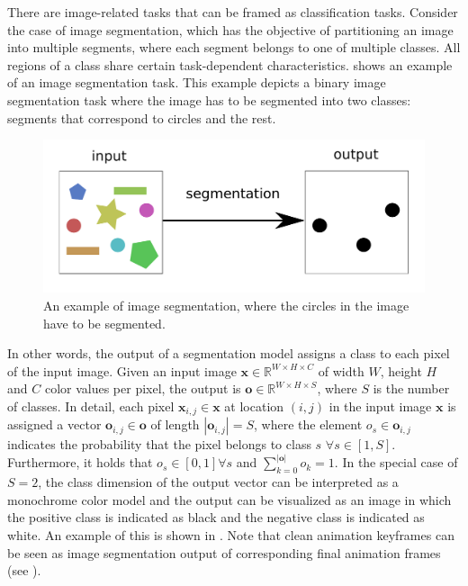 There are image-related tasks that can be framed as classification tasks. Consider the case of image segmentation, which has the objective of partitioning an image into multiple segments, where each segment belongs to one of multiple classes. All regions of a class share certain task-dependent characteristics.  shows an example of an image segmentation task. This example depicts a binary image segmentation task where the image has to be segmented into two classes: segments that correspond to circles and the rest.

\begin{figure}
    \centering
    \includegraphics[width=\textwidth]{graphics/segmentation.pdf}
    \caption{An example of image segmentation, where the circles in the image have to be segmented.}
    \label{fig:segmentation}
\end{figure}

In other words, the output of a segmentation model assigns a class to each pixel of the input image. Given an input image $\mathbf{x}\in\mathbb{R}^{W\times H\times C}$ of width $W$, height $H$ and $C$ color values per pixel, the output is $\mathbf{o}\in\mathbb{R}^{W\times H\times S}$, where $S$ is the number of classes. In detail, each pixel $\mathbf{x}_{i,j}\in\mathbf{x}$ at location $(i,j)$ in the input image $\mathbf{x}$ is assigned a vector $\mathbf{o}_{i,j}\in\mathbf{o}$ of length $|\mathbf{o}_{i,j}|=S$, where the element $o_s\in\mathbf{o}_{i,j}$ indicates the probability that the pixel belongs to class $s$ $\forall s\in[1,S]$. Furthermore, it holds that $o_s\in[0,1] \forall s$ and $\sum_{k=0}^{|\mathbf{o}|} o_k=1$. In the special case of $S=2$, the class dimension of the output vector can be interpreted as a monochrome color model and the output can be visualized as an image in which the positive class is indicated as black and the negative class is indicated as white. An example of this is shown in . Note that clean animation keyframes can be seen as image segmentation output of corresponding final animation frames (see ).

